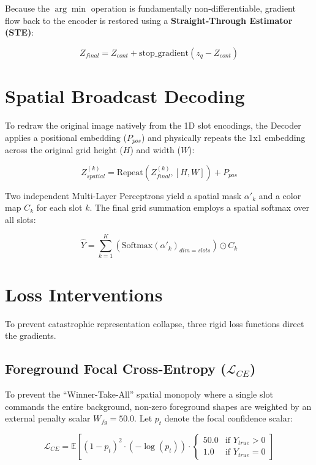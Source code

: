 \documentclass[11pt,a4paper]{article}
\begin{document}
Because the $\arg\min$ operation is fundamentally non-differentiable, gradient flow back to the encoder is restored using a \textbf{Straight-Through Estimator (STE)}:

\begin{equation}
Z_{final} = Z_{cont} + \text{stop\_gradient}(z_q - Z_{cont})
\end{equation}

\section{Spatial Broadcast Decoding}
To redraw the original image natively from the 1D slot encodings, the Decoder applies a positional embedding ($P_{pos}$) and physically repeats the 1x1 embedding across the original grid height ($H$) and width ($W$):

\begin{equation}
Z_{spatial}^{(k)} = \text{Repeat}(Z_{final}^{(k)}, [H, W]) + P_{pos}
\end{equation}

Two independent Multi-Layer Perceptrons yield a spatial mask $\alpha'_k$ and a color map $C_k$ for each slot $k$. The final grid summation employs a spatial softmax over all slots:

\begin{equation}
\hat{Y} = \sum_{k=1}^K \left( \text{Softmax}(\alpha'_k)_{dim=slots} \right) \odot C_k
\end{equation}

\section{Loss Interventions}
To prevent catastrophic representation collapse, three rigid loss functions direct the gradients.

\subsection{Foreground Focal Cross-Entropy ($\mathcal{L}_{CE}$)}
To prevent the ``Winner-Take-All'' spatial monopoly where a single slot commands the entire background, non-zero foreground shapes are weighted by an external penalty scalar $W_{fg} = 50.0$. Let $p_t$ denote the focal confidence scalar:

\begin{equation}
\mathcal{L}_{CE} = \mathbb{E}\left[ (1 - p_t)^2 \cdot (-\log(p_t)) \cdot \begin{cases} 50.0 & \text{if } Y_{true} > 0 \\ 1.0 & \text{if } Y_{true} = 0 \end{cases} \right]
\end{equation}
\end{document}
